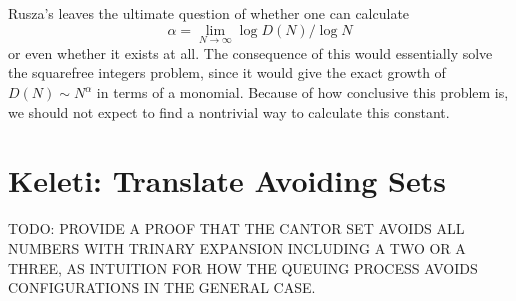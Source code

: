 \documentclass{report}
\theoremstyle{plain}
\theoremstyle{plain}
\begin{document}
Rusza's leaves the ultimate question of whether one can calculate
%
\[ \alpha = \lim_{N \to \infty} \log D(N) / \log N \]
%
or even whether it exists at all. The consequence of this would essentially solve the squarefree integers problem, since it would give the exact growth of $D(N) \sim N^\alpha$ in terms of a monomial. Because of how conclusive this problem is, we should not expect to find a nontrivial way to calculate this constant.











\section{Keleti: Translate Avoiding Sets}

TODO: PROVIDE A PROOF THAT THE CANTOR SET AVOIDS ALL NUMBERS WITH TRINARY EXPANSION INCLUDING A TWO OR A THREE, AS INTUITION FOR HOW THE QUEUING PROCESS AVOIDS CONFIGURATIONS IN THE GENERAL CASE.
\end{document}
